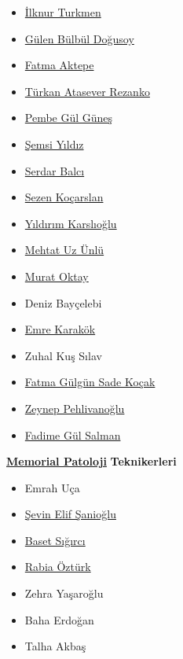 \documentclass[
  letterpaper,
  DIV=11,
  numbers=noendperiod]{scrreprt}
\begin{document}
\begin{itemize}
\item
  \href{https://www.memorial.com.tr/en/doctors/ilknur-turkmen-1975}{İlknur
  Turkmen}
\item
  \href{https://www.memorial.com.tr/doktorlar/gulen-bulbul-dogusoy}{Gülen
  Bülbül Doğusoy}
\item
  \href{https://www.memorial.com.tr/doktorlar/fatma-aktepe}{Fatma
  Aktepe}
\item
  \href{https://www.memorial.com.tr/doktorlar/turkan-atasever-rezanko}{Türkan
  Atasever Rezanko}
\item
  \href{https://www.memorial.com.tr/doktorlar/pembe-gul-gunes}{Pembe Gül
  Güneş}
\item
  \href{https://www.memorial.com.tr/doktorlar/semsi-yildiz-1}{Şemsi
  Yıldız}
\item
  \href{https://www.memorial.com.tr/doktorlar/serdar-balci-k}{Serdar
  Balcı}
\item
  \href{https://www.memorial.com.tr/doktorlar/sezen-kocarslan}{Sezen
  Koçarslan}
\item
  \href{https://www.memorial.com.tr/doktorlar/yildirim-karslioglu-k}{Yıldırım
  Karslıoğlu}
\item
  \href{https://www.memorial.com.tr/doktorlar/mehtat-uz-unlu-k}{Mehtat
  Uz Ünlü}
\item
  \href{https://www.memorial.com.tr/doktorlar/murat-oktay}{Murat Oktay}
\item
  Deniz Bayçelebi
\item
  \href{https://www.memorial.com.tr/doktorlar/emre-karakok}{Emre
  Karakök}
\item
  Zuhal Kuş Sılav
\item
  \href{https://www.memorial.com.tr/doktorlar/fatma-gulgun-sade-kocak-k}{Fatma
  Gülgün Sade Koçak}
\item
  \href{https://www.memorial.com.tr/doktorlar/zeynep-pehlivanoglu-k}{Zeynep
  Pehlivanoğlu}
\item
  \href{https://www.memorial.com.tr/doktorlar/fadime-gul-salman}{Fadime
  Gül Salman}
\end{itemize}

\href{https://patoloji.memorial.com.tr/}{\textbf{Memorial Patoloji}}
\textbf{Teknikerleri}

\begin{itemize}
\item
  Emrah Uça
\item
  \href{https://www.linkedin.com/in/\%C5\%9Fevin-elif-\%C5\%9Fanio\%C4\%9Flu-99449a1b0/}{Şevin
  Elif Şanioğlu}
\item
  \href{https://www.linkedin.com/in/baset-s\%C4\%B1\%C4\%9F\%C4\%B1rc\%C4\%B1-aa2406141/}{Baset
  Sığırcı}
\item
  \href{https://www.linkedin.com/in/rabia-\%C3\%B6zt\%C3\%BCrk-4989b3151/}{Rabia
  Öztürk}
\item
  Zehra Yaşaroğlu
\item
  Baha Erdoğan
\item
  Talha Akbaş
\end{itemize}
\end{document}
